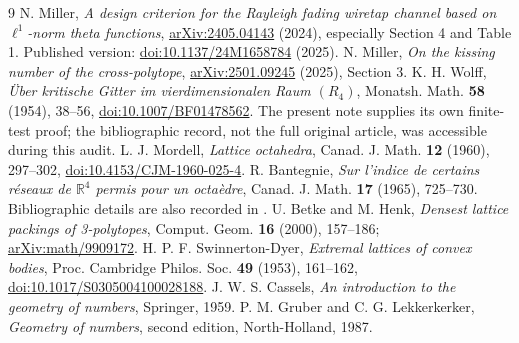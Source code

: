 \documentclass[11pt,reqno]{amsart}
\theoremstyle{definition}
\newcommand{\R}{\mathbb R}
\begin{document}
\begin{thebibliography}{9}
N. Miller, \emph{A design criterion for the Rayleigh fading wiretap
channel based on $\ell^1$-norm theta functions},
\href{https://arxiv.org/abs/2405.04143}{arXiv:2405.04143} (2024),
especially Section 4 and Table 1. Published version:
\href{https://doi.org/10.1137/24M1658784}{doi:10.1137/24M1658784} (2025).
N. Miller, \emph{On the kissing number of the cross-polytope},
\href{https://arxiv.org/abs/2501.09245}{arXiv:2501.09245} (2025), Section 3.
K. H. Wolff, \emph{\"Uber kritische Gitter im vierdimensionalen Raum
$(R_4)$}, Monatsh. Math. \textbf{58} (1954), 38--56,
\href{https://doi.org/10.1007/BF01478562}{doi:10.1007/BF01478562}.
The present note supplies its own finite-test proof; the bibliographic
record, not the full original article, was accessible during this audit.
L. J. Mordell, \emph{Lattice octahedra}, Canad. J. Math. \textbf{12}
(1960), 297--302,
\href{https://doi.org/10.4153/CJM-1960-025-4}{doi:10.4153/CJM-1960-025-4}.
R. Bantegnie, \emph{Sur l'indice de certains r\'eseaux de $\R^4$ permis
pour un octa\`edre}, Canad. J. Math. \textbf{17} (1965), 725--730.
Bibliographic details are also recorded in \cite{BetkeHenk}.
U. Betke and M. Henk, \emph{Densest lattice packings of 3-polytopes},
Comput. Geom. \textbf{16} (2000), 157--186;
\href{https://arxiv.org/abs/math/9909172}{arXiv:math/9909172}.
H. P. F. Swinnerton-Dyer, \emph{Extremal lattices of convex bodies},
Proc. Cambridge Philos. Soc. \textbf{49} (1953), 161--162,
\href{https://doi.org/10.1017/S0305004100028188}{doi:10.1017/S0305004100028188}.
J. W. S. Cassels, \emph{An introduction to the geometry of numbers},
Springer, 1959.
P. M. Gruber and C. G. Lekkerkerker, \emph{Geometry of numbers},
second edition, North-Holland, 1987.
\end{thebibliography}
\end{document}
